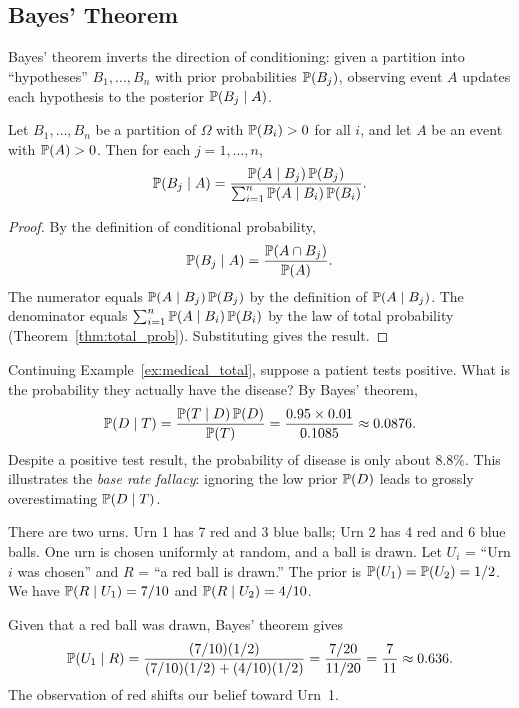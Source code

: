 \documentclass[11pt,a4paper]{article}
\begin{document}
\subsection{Bayes' Theorem}

\begin{keyresult}[title={Bayes' Theorem -- The Belief Update Rule}]
Bayes' theorem inverts the direction of conditioning: given a partition
into ``hypotheses'' $B_1, \ldots, B_n$ with prior probabilities
$\mathbb{P}(B_j)$, observing event $A$ updates each hypothesis to the
posterior $\mathbb{P}(B_j \mid A)$.
\end{keyresult}

\begin{theorem}
\label{thm:bayes}
Let $B_1, \ldots, B_n$ be a partition of $\Omega$ with
$\mathbb{P}(B_i) > 0$ for all $i$, and let $A$ be an event with
$\mathbb{P}(A) > 0$. Then for each $j = 1, \ldots, n$,
\[
    \mathbb{P}(B_j \mid A)
    = \frac{\mathbb{P}(A \mid B_j) \, \mathbb{P}(B_j)}
           {\sum_{i=1}^n \mathbb{P}(A \mid B_i) \, \mathbb{P}(B_i)}.
\]
\end{theorem}

\begin{proof}
By the definition of conditional probability,
\[
    \mathbb{P}(B_j \mid A) = \frac{\mathbb{P}(A \cap B_j)}{\mathbb{P}(A)}.
\]
The numerator equals
$\mathbb{P}(A \mid B_j) \, \mathbb{P}(B_j)$
by the definition of $\mathbb{P}(A \mid B_j)$. The denominator equals
$\sum_{i=1}^n \mathbb{P}(A \mid B_i) \, \mathbb{P}(B_i)$
by the law of total probability (Theorem~\ref{thm:total_prob}).
Substituting gives the result.
\end{proof}

\begin{example}
\label{ex:medical_bayes}
Continuing Example~\ref{ex:medical_total}, suppose a patient tests
positive. What is the probability they actually have the disease?
By Bayes' theorem,
\[
    \mathbb{P}(D \mid T)
    = \frac{\mathbb{P}(T \mid D) \, \mathbb{P}(D)}{\mathbb{P}(T)}
    = \frac{0.95 \times 0.01}{0.1085}
    \approx 0.0876.
\]
Despite a positive test result, the probability of disease is only about
8.8\%. This illustrates the \emph{base rate fallacy}: ignoring the low
prior $\mathbb{P}(D)$ leads to grossly overestimating $\mathbb{P}(D \mid T)$.
\end{example}

\begin{example}
\label{ex:urn_bayes}
There are two urns. Urn 1 has 7 red and 3 blue balls; Urn 2 has 4 red
and 6 blue balls. One urn is chosen uniformly at random, and a ball is
drawn. Let $U_i$ = ``Urn $i$ was chosen'' and $R$ = ``a red ball is
drawn.'' The prior is $\mathbb{P}(U_1) = \mathbb{P}(U_2) = 1/2$. We have
$\mathbb{P}(R \mid U_1) = 7/10$ and $\mathbb{P}(R \mid U_2) = 4/10$.

Given that a red ball was drawn, Bayes' theorem gives
\[
    \mathbb{P}(U_1 \mid R)
    = \frac{(7/10)(1/2)}{(7/10)(1/2) + (4/10)(1/2)}
    = \frac{7/20}{11/20}
    = \frac{7}{11} \approx 0.636.
\]
The observation of red shifts our belief toward Urn~1.
\end{example}
\end{document}
